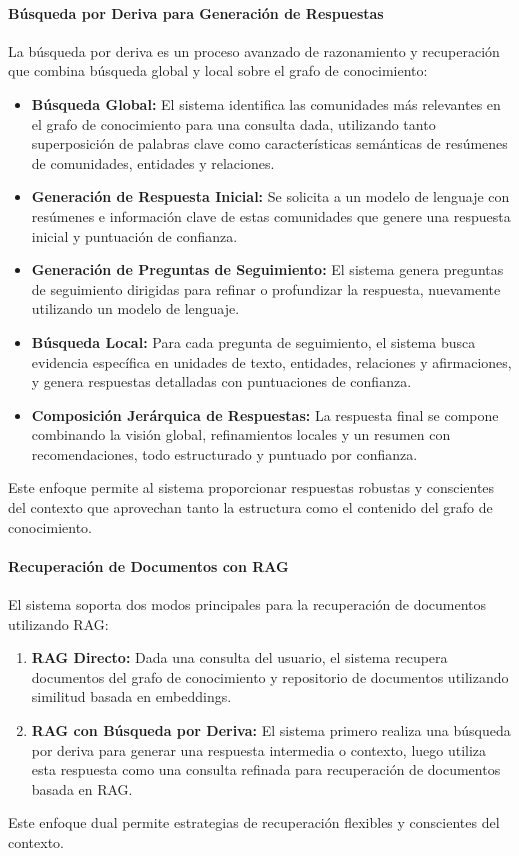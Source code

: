 \documentclass[12pt]{article}
\begin{document}
\paragraph{Búsqueda por Deriva para Generación de Respuestas}
La búsqueda por deriva es un proceso avanzado de razonamiento y recuperación que combina búsqueda global y local sobre el grafo de conocimiento:
\begin{itemize}
    \item \textbf{Búsqueda Global:} El sistema identifica las comunidades más relevantes en el grafo de conocimiento para una consulta dada, utilizando tanto superposición de palabras clave como características semánticas de resúmenes de comunidades, entidades y relaciones.
    \item \textbf{Generación de Respuesta Inicial:} Se solicita a un modelo de lenguaje con resúmenes e información clave de estas comunidades que genere una respuesta inicial y puntuación de confianza.
    \item \textbf{Generación de Preguntas de Seguimiento:} El sistema genera preguntas de seguimiento dirigidas para refinar o profundizar la respuesta, nuevamente utilizando un modelo de lenguaje.
    \item \textbf{Búsqueda Local:} Para cada pregunta de seguimiento, el sistema busca evidencia específica en unidades de texto, entidades, relaciones y afirmaciones, y genera respuestas detalladas con puntuaciones de confianza.
    \item \textbf{Composición Jerárquica de Respuestas:} La respuesta final se compone combinando la visión global, refinamientos locales y un resumen con recomendaciones, todo estructurado y puntuado por confianza.
\end{itemize}
Este enfoque permite al sistema proporcionar respuestas robustas y conscientes del contexto que aprovechan tanto la estructura como el contenido del grafo de conocimiento.

\paragraph{Recuperación de Documentos con RAG}
El sistema soporta dos modos principales para la recuperación de documentos utilizando RAG:
\begin{enumerate}
    \item \textbf{RAG Directo:} Dada una consulta del usuario, el sistema recupera documentos del grafo de conocimiento y repositorio de documentos utilizando similitud basada en embeddings.
    \item \textbf{RAG con Búsqueda por Deriva:} El sistema primero realiza una búsqueda por deriva para generar una respuesta intermedia o contexto, luego utiliza esta respuesta como una consulta refinada para recuperación de documentos basada en RAG.
\end{enumerate}
Este enfoque dual permite estrategias de recuperación flexibles y conscientes del contexto.
\end{document}
